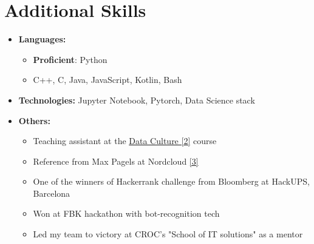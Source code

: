 \documentclass[letterpaper,11pt]{article}
\newcommand{\resumeSubHeadingListStart}{\begin{itemize}[leftmargin=*]}
\newcommand{\resumeSubHeadingListEnd}{\end{itemize}}
\begin{document}
\section{Additional Skills}
 \resumeSubHeadingListStart
    \item \textbf{Languages:}{
    \begin{itemize}
    	\item \textbf{Proficient}{: Python}
    	\item {C++, C, Java, JavaScript, Kotlin, Bash}
    \end{itemize} 
    }
    \item \textbf{Technologies:}{ Jupyter Notebook, Pytorch, Data Science stack}
	\item \textbf{Others:}{
    \begin{itemize}
    	\item Teaching assistant at the \href{https://www.hse.ru/en/news/admission/207148580.html}{Data Culture [2]} course
    	\item Reference from Max Pagels at Nordcloud \href{https://github.com/MaximArtemev/Something/blob/master/reference-maxim-artemev.pdf}{[3]}
    	\item One of the winners of Hackerrank challenge from Bloomberg at HackUPS, Barcelona
    	\item Won at FBK hackathon with bot-recognition tech
    	\item Led my team to victory at CROC’s "School of IT solutions" as a mentor
   	\end{itemize}
	}
 \resumeSubHeadingListEnd


\end{document}
